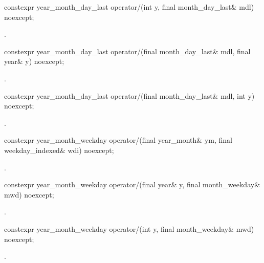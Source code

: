 \begin{itemdecl}
constexpr year_month_day_last
  operator/(int y, final month_day_last& mdl) noexcept;
\end{itemdecl}

\begin{itemdescr}
\pnum
\returns {}.
\end{itemdescr}

\begin{itemdecl}
constexpr year_month_day_last
  operator/(final month_day_last& mdl, final year& y) noexcept;
\end{itemdecl}

\begin{itemdescr}
\pnum
\returns {}.
\end{itemdescr}

\begin{itemdecl}
constexpr year_month_day_last
  operator/(final month_day_last& mdl, int y) noexcept;
\end{itemdecl}

\begin{itemdescr}
\pnum
\returns {}.
\end{itemdescr}

\begin{itemdecl}
constexpr year_month_weekday
  operator/(final year_month& ym, final weekday_indexed& wdi) noexcept;
\end{itemdecl}

\begin{itemdescr}
\pnum
\returns {}.
\end{itemdescr}

\begin{itemdecl}
constexpr year_month_weekday
  operator/(final year& y, final month_weekday& mwd) noexcept;
\end{itemdecl}

\begin{itemdescr}
\pnum
\returns {}.
\end{itemdescr}

\begin{itemdecl}
constexpr year_month_weekday
  operator/(int y, final month_weekday& mwd) noexcept;
\end{itemdecl}

\begin{itemdescr}
\pnum
\returns {}.
\end{itemdescr}

